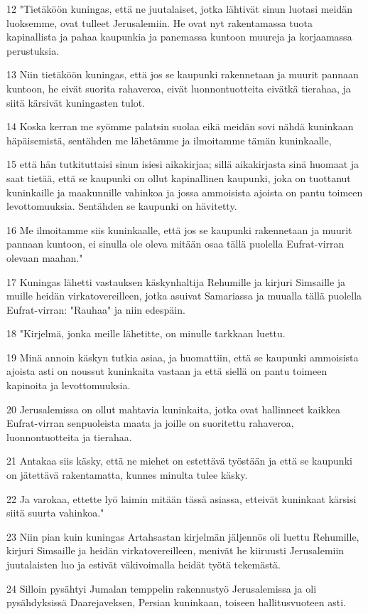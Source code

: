 \par 12 "Tietäköön kuningas, että ne juutalaiset, jotka lähtivät sinun luotasi meidän luoksemme, ovat tulleet Jerusalemiin. He ovat nyt rakentamassa tuota kapinallista ja pahaa kaupunkia ja panemassa kuntoon muureja ja korjaamassa perustuksia.
\par 13 Niin tietäköön kuningas, että jos se kaupunki rakennetaan ja muurit pannaan kuntoon, he eivät suorita rahaveroa, eivät luonnontuotteita eivätkä tierahaa, ja siitä kärsivät kuningasten tulot.
\par 14 Koska kerran me syömme palatsin suolaa eikä meidän sovi nähdä kuninkaan häpäisemistä, sentähden me lähetämme ja ilmoitamme tämän kuninkaalle,
\par 15 että hän tutkituttaisi sinun isiesi aikakirjaa; sillä aikakirjasta sinä huomaat ja saat tietää, että se kaupunki on ollut kapinallinen kaupunki, joka on tuottanut kuninkaille ja maakunnille vahinkoa ja jossa ammoisista ajoista on pantu toimeen levottomuuksia. Sentähden se kaupunki on hävitetty.
\par 16 Me ilmoitamme siis kuninkaalle, että jos se kaupunki rakennetaan ja muurit pannaan kuntoon, ei sinulla ole oleva mitään osaa tällä puolella Eufrat-virran olevaan maahan."
\par 17 Kuningas lähetti vastauksen käskynhaltija Rehumille ja kirjuri Simsaille ja muille heidän virkatovereilleen, jotka asuivat Samariassa ja muualla tällä puolella Eufrat-virran: "Rauhaa" ja niin edespäin.
\par 18 "Kirjelmä, jonka meille lähetitte, on minulle tarkkaan luettu.
\par 19 Minä annoin käskyn tutkia asiaa, ja huomattiin, että se kaupunki ammoisista ajoista asti on noussut kuninkaita vastaan ja että siellä on pantu toimeen kapinoita ja levottomuuksia.
\par 20 Jerusalemissa on ollut mahtavia kuninkaita, jotka ovat hallinneet kaikkea Eufrat-virran senpuoleista maata ja joille on suoritettu rahaveroa, luonnontuotteita ja tierahaa.
\par 21 Antakaa siis käsky, että ne miehet on estettävä työstään ja että se kaupunki on jätettävä rakentamatta, kunnes minulta tulee käsky.
\par 22 Ja varokaa, ettette lyö laimin mitään tässä asiassa, etteivät kuninkaat kärsisi siitä suurta vahinkoa."
\par 23 Niin pian kuin kuningas Artahsastan kirjelmän jäljennös oli luettu Rehumille, kirjuri Simsaille ja heidän virkatovereilleen, menivät he kiiruusti Jerusalemiin juutalaisten luo ja estivät väkivoimalla heidät työtä tekemästä.
\par 24 Silloin pysähtyi Jumalan temppelin rakennustyö Jerusalemissa ja oli pysähdyksissä Daarejaveksen, Persian kuninkaan, toiseen hallitusvuoteen asti.

